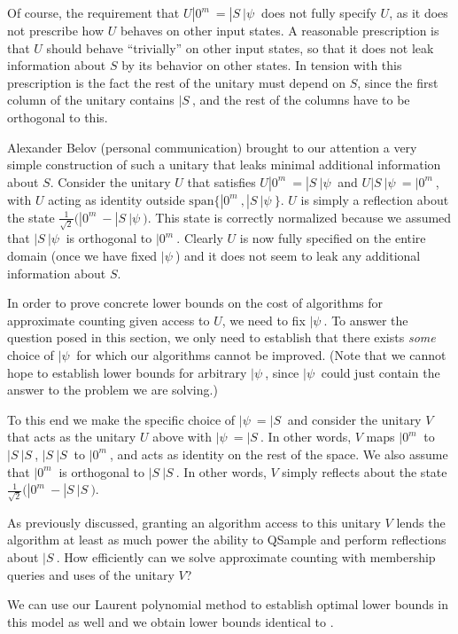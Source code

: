 Of course, the requirement that $U|0^m\> = |S\>|\psi\>$ does not fully specify $U$, as
it does not prescribe how $U$ behaves on other input states.
A reasonable prescription is that $U$ should behave ``trivially'' on other input states, so that it does not leak information about $S$ by its behavior on other states. 
In tension with this prescription is the fact the rest of the unitary must depend on $S$, since the first column of the unitary contains $|S\>$, and the rest of the columns have to be orthogonal to this.

Alexander Belov (personal communication) brought to our attention a 
very simple construction of such a unitary that leaks minimal additional information about $S$. 
Consider the unitary $U$ that satisfies $U|0^m\> = |S\>|\psi\>$ and $U|S\>|\psi\> = |0^m\>$, with $U$ acting as identity outside $\mathrm{span}\{|0^m\>,|S\>|\psi\>\}$. $U$ is simply a reflection about the state $\frac{1}{\sqrt{2}}\bigl(|0^m\>-|S\>|\psi\>\bigr)$. This state is correctly normalized because we assumed that $|S\>|\psi\>$ is orthogonal to $|0^m\>$. 
Clearly $U$ is now fully specified on the entire domain (once we have fixed $|\psi\>$) and it does not seem to leak any additional information about $S$.

In order to prove concrete lower bounds on the cost
of algorithms for approximate counting given access to $U$, we need to fix $|\psi\>$. 
To answer the question posed in this section, we only need to establish that there exists \emph{some} choice of $|\psi\>$ for which our algorithms cannot be improved. (Note that we cannot hope to establish lower bounds for arbitrary $|\psi\>$, since $|\psi\>$ could just contain the answer to the problem we are solving.)

To this end we make the specific choice of $|\psi\> = |S\>$ and consider the unitary $V$ that acts as the unitary $U$ above with $|\psi\> = |S\>$. 
In other words, $V$ maps $|0^m\>$ to $|S\>|S\>$, $|S\>|S\>$ to $|0^m\>$, and acts as identity on the rest of the space. 
We also assume that $|0^m\>$ is orthogonal to $|S\>|S\>$. 
In other words, $V$ simply reflects about the state $\frac{1}{\sqrt{2}}\bigl(|0^m\>-|S\>|S\>\bigr)$.

As previously discussed, granting an algorithm access to this unitary $V$ lends the algorithm at least as much power the ability to QSample and perform reflections about $|S\>$. How efficiently can we solve approximate counting with membership queries and uses of the unitary $V$? 

We can use our Laurent polynomial method to establish optimal lower bounds in this model as well and we obtain lower bounds identical to . 

